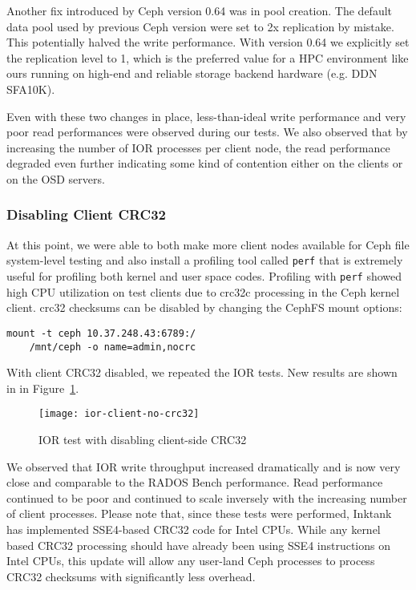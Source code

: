 Another fix introduced by Ceph version 0.64 was in pool creation.  The default
data pool used by previous Ceph version were set to 2x replication by mistake.
This potentially halved the write performance. With version 0.64 we explicitly
set the replication level to 1, which is the preferred value for a HPC
environment like ours running on high-end and reliable storage backend hardware
(e.g. DDN SFA10K).

Even with these two changes in place, less-than-ideal write performance and
very poor read performances were observed during our tests.  We also observed
that by increasing the number of IOR processes per client node, the read
performance degraded even further indicating some kind of contention either on
the clients or on the OSD servers.


\subsubsection{Disabling Client CRC32}

At this point, we were able to both make more client nodes available for Ceph
file system-level testing and also install a profiling tool called \verb!perf!
that is extremely useful for profiling both kernel and user space codes.
Profiling with \verb!perf! showed high CPU utilization on test clients due to
crc32c processing in the Ceph kernel client.  crc32 checksums can be disabled
by changing the CephFS mount options:

\begin{Verbatim}[fontsize=\small]
mount -t ceph 10.37.248.43:6789:/ 
    /mnt/ceph -o name=admin,nocrc
\end{Verbatim}


With client CRC32 disabled, we repeated the IOR tests. New results are shown in
in Figure~\ref{fig:ior-no-client-crc32}. 

\begin{figure}[htb]
\centering
\texttt{[image: ior-client-no-crc32]}
\caption{IOR test with disabling client-side CRC32}
\label{fig:ior-no-client-crc32}
\end{figure}

We observed that IOR write throughput increased dramatically and is now very
close and comparable to the RADOS Bench performance. Read performance continued
to be poor and continued to scale inversely with the increasing number of
client processes.  Please note that, since these tests were performed, Inktank
has implemented SSE4-based CRC32 code for Intel CPUs.  While any kernel based
CRC32 processing should have already been using SSE4 instructions on Intel
CPUs, this update will allow any user-land Ceph processes to process CRC32
checksums with significantly less overhead.

